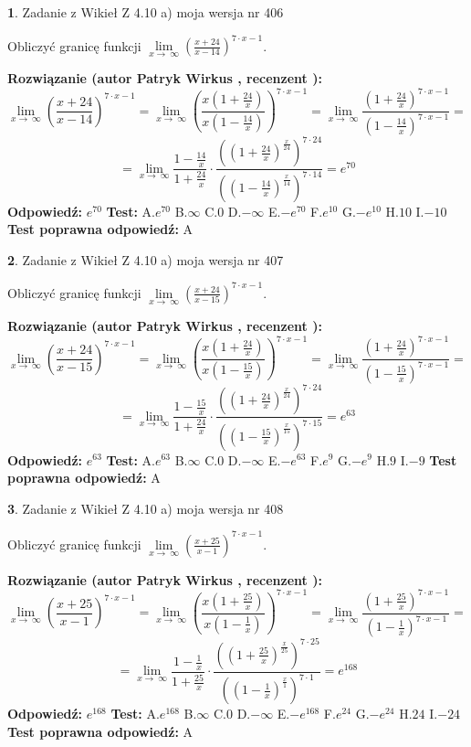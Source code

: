 \documentclass[12pt, a4paper]{article}
\theoremstyle{definition} %
\newtheorem{zad}{}
\newcommand{\zadStart}[1]{\begin{zad}#1\newline}
\newcommand{\zadStop}{\end{zad}}
\newcommand{\rozwStart}[2]{\noindent \textbf{Rozwiązanie (autor #1 , recenzent #2): }\newline}
\newcommand{\rozwStop}{\newline}
\newcommand{\odpStart}{\noindent \textbf{Odpowiedź:}\newline}
\newcommand{\odpStop}{\newline}
\newcommand{\testStart}{\noindent \textbf{Test:}\newline}
\newcommand{\testStop}{\newline}
\newcommand{\kluczStart}{\noindent \textbf{Test poprawna odpowiedź:}\newline}
\newcommand{\kluczStop}{\newline}
\begin{document}
\zadStart{Zadanie z Wikieł Z 4.10 a) moja wersja nr 406}

Obliczyć granicę funkcji  $\lim\limits_{x\to\ \infty}(\frac{x+24}{x-14})^{7\cdot x-1}$.
\zadStop
\rozwStart{Patryk Wirkus}{}
$$\lim\limits_{x\to\ \infty}(\frac{x+24}{x-14})^{7\cdot x-1} = \lim\limits_{x\to\ \infty}(\frac{x(1+\frac{24}{x})}{x(1-\frac{14}{x})})^{7\cdot x-1}=\lim\limits_{x\to\ \infty}\frac{(1+\frac{24}{x})^{7\cdot x-1}}{(1-\frac{14}{x})^{7\cdot x-1}}=$$
$$=\lim\limits_{x\to\ \infty}\frac{1-\frac{14}{x}}{1+\frac{24}{x}}\cdot\frac{((1+\frac{24}{x})^{\frac{x}{24}})^{7\cdot24}}{((1-\frac{14}{x})^{\frac{x}{14}})^{7\cdot14}}=e^{70}$$
\rozwStop
\odpStart
$e^{70}$
\odpStop
\testStart
A.$e^{70}$ B.$\infty$ C.$0$ D.$-\infty$ E.$-e^{70}$
F.$e^{10}$ G.$-e^{10}$
H.$10$
I.$-10$
\testStop
\kluczStart
A
\kluczStop



\zadStart{Zadanie z Wikieł Z 4.10 a) moja wersja nr 407}

Obliczyć granicę funkcji  $\lim\limits_{x\to\ \infty}(\frac{x+24}{x-15})^{7\cdot x-1}$.
\zadStop
\rozwStart{Patryk Wirkus}{}
$$\lim\limits_{x\to\ \infty}(\frac{x+24}{x-15})^{7\cdot x-1} = \lim\limits_{x\to\ \infty}(\frac{x(1+\frac{24}{x})}{x(1-\frac{15}{x})})^{7\cdot x-1}=\lim\limits_{x\to\ \infty}\frac{(1+\frac{24}{x})^{7\cdot x-1}}{(1-\frac{15}{x})^{7\cdot x-1}}=$$
$$=\lim\limits_{x\to\ \infty}\frac{1-\frac{15}{x}}{1+\frac{24}{x}}\cdot\frac{((1+\frac{24}{x})^{\frac{x}{24}})^{7\cdot24}}{((1-\frac{15}{x})^{\frac{x}{15}})^{7\cdot15}}=e^{63}$$
\rozwStop
\odpStart
$e^{63}$
\odpStop
\testStart
A.$e^{63}$ B.$\infty$ C.$0$ D.$-\infty$ E.$-e^{63}$
F.$e^{9}$ G.$-e^{9}$
H.$9$
I.$-9$
\testStop
\kluczStart
A
\kluczStop



\zadStart{Zadanie z Wikieł Z 4.10 a) moja wersja nr 408}

Obliczyć granicę funkcji  $\lim\limits_{x\to\ \infty}(\frac{x+25}{x-1})^{7\cdot x-1}$.
\zadStop
\rozwStart{Patryk Wirkus}{}
$$\lim\limits_{x\to\ \infty}(\frac{x+25}{x-1})^{7\cdot x-1} = \lim\limits_{x\to\ \infty}(\frac{x(1+\frac{25}{x})}{x(1-\frac{1}{x})})^{7\cdot x-1}=\lim\limits_{x\to\ \infty}\frac{(1+\frac{25}{x})^{7\cdot x-1}}{(1-\frac{1}{x})^{7\cdot x-1}}=$$
$$=\lim\limits_{x\to\ \infty}\frac{1-\frac{1}{x}}{1+\frac{25}{x}}\cdot\frac{((1+\frac{25}{x})^{\frac{x}{25}})^{7\cdot25}}{((1-\frac{1}{x})^{\frac{x}{1}})^{7\cdot1}}=e^{168}$$
\rozwStop
\odpStart
$e^{168}$
\odpStop
\testStart
A.$e^{168}$ B.$\infty$ C.$0$ D.$-\infty$ E.$-e^{168}$
F.$e^{24}$ G.$-e^{24}$
H.$24$
I.$-24$
\testStop
\kluczStart
A
\kluczStop
\end{document}
